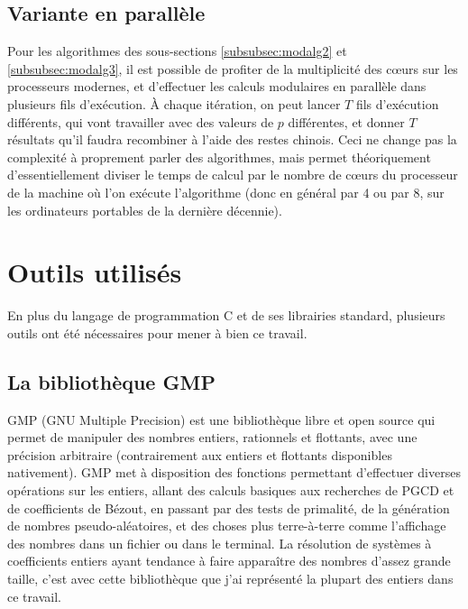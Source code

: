 \documentclass[french]{article}
\begin{document}
\subsection{Variante en parallèle} \label{subsec:para}
Pour les algorithmes des sous-sections \ref{subsubsec:modalg2} et \ref{subsubsec:modalg3}, il est possible de profiter de la multiplicité des cœurs sur les processeurs modernes, et d'effectuer les calculs modulaires en parallèle dans plusieurs fils d'exécution.
À chaque itération, on peut lancer $T$ fils d'exécution différents, qui vont travailler avec des valeurs de $p$ différentes, et donner $T$ résultats qu'il faudra recombiner à l'aide des restes chinois.
Ceci ne change pas la complexité à proprement parler des algorithmes, mais permet théoriquement d'essentiellement diviser le temps de calcul par le nombre de cœurs du processeur de la machine où l'on exécute l'algorithme (donc en général par 4 ou par 8, sur les ordinateurs portables de la dernière décennie).
\vspace{10cm}
\section{Outils utilisés} \label{sec:outils}
En plus du langage de programmation C et de ses librairies standard, plusieurs outils ont été nécessaires pour mener à bien ce travail.
\subsection{La bibliothèque GMP}
GMP (GNU Multiple Precision) est une bibliothèque libre et open source qui permet de manipuler des nombres entiers, rationnels et flottants, avec une précision arbitraire (contrairement aux entiers et flottants disponibles nativement). GMP met à disposition des fonctions permettant d'effectuer diverses opérations sur les entiers, allant des calculs basiques aux recherches de PGCD et de coefficients de Bézout, en passant par des tests de primalité, de la génération de nombres pseudo-aléatoires, et des choses plus terre-à-terre comme l'affichage des nombres dans un fichier ou dans le terminal. La résolution de systèmes à coefficients entiers ayant tendance à faire apparaître des nombres d'assez grande taille, c'est avec cette bibliothèque que j'ai représenté la plupart des entiers dans ce travail.
\end{document}
